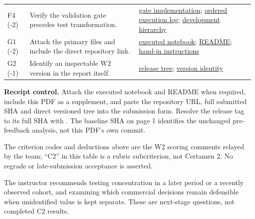 \documentclass[10pt,a4paper]{article}
\newcommand{\sectionhead}[1]{\Needspace{8\baselineskip}\vspace{.4em}{\large\bfseries\color{navy}#1}\par\vspace{.1em}}
\begin{document}
{\begin{tabularx}{\linewidth}{@{}P{.12\linewidth}P{.35\linewidth}Y@{}}
F4 (-2) & Verify the validation gate precedes test transformation. & \href{https://github.com/DirtyCheese02/online-retail-bi-medina-castillo/blob/w2-feedback-2026-11-08/src/w2_analysis.py\#L316}{gate implementation}; \href{https://github.com/DirtyCheese02/online-retail-bi-medina-castillo/blob/w2-feedback-2026-11-08/data/processed/validation_execution.csv}{ordered execution log}; \href{https://github.com/DirtyCheese02/online-retail-bi-medina-castillo/blob/w2-feedback-2026-11-08/data/processed/split_hierarchy.csv}{development hierarchy} \\
G1 (-2) & Attach the primary files and include the direct repository link. & \href{https://github.com/DirtyCheese02/online-retail-bi-medina-castillo/blob/w2-feedback-2026-11-08/notebooks/W2_project.ipynb}{executed notebook}; \href{https://github.com/DirtyCheese02/online-retail-bi-medina-castillo/blob/w2-feedback-2026-11-08/README.md}{README}; \href{https://github.com/DirtyCheese02/online-retail-bi-medina-castillo/blob/w2-feedback-2026-11-08/SUBMISSION.md}{hand-in instructions} \\
G2 (-1) & Identify an inspectable W2 version in the report itself. & \href{https://github.com/DirtyCheese02/online-retail-bi-medina-castillo/tree/w2-feedback-2026-11-08}{release tree}; \href{https://github.com/DirtyCheese02/online-retail-bi-medina-castillo/blob/w2-feedback-2026-11-08/evidence/submission_identity.json}{version identity} \\\bottomrule\end{tabularx}}
\par\textbf{Receipt control.} Attach the executed notebook and README when required, include this PDF as a supplement, and paste the repository URL, full submitted SHA and direct versioned tree into the submission form. Resolve the release tag to its full SHA with . The baseline SHA on page 1 identifies the unchanged pre-feedback analysis, not this PDF's own commit.

The criterion codes and deductions above are the W2 scoring comments relayed by the team; ``C2'' in this table is a rubric subcriterion, not Certamen 2. No regrade or late-submission acceptance is asserted.
\clearpage
\sectionhead{12\quad C2 continuation: value coverage and stability}
The instructor recommends testing concentration in a later period or a recently observed cohort, and examining which commercial decisions remain defensible when unidentified value is kept separate. These are next-stage questions, not completed C2 results.
\end{document}
